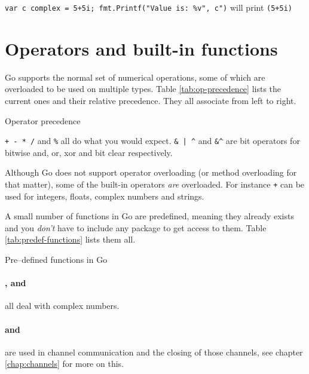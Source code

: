 \lstinline{var c complex = 5+5i; fmt.Printf("Value is: %v", c")}\newline
will print\newline
\indent\lstinline{(5+5i)}

\section{Operators and built-in functions}
Go supports the normal set of numerical operations, some of which are
overloaded to be used on multiple types. Table \ref{tab:op-precedence}
lists the current ones and their relative precedence. They
all associate from left to right.

\begin{table}[H]
\begin{center}
\caption{Operator precedence}
\label{tab:op-precedence}

\end{center}
\end{table}
\verb|+ - * /| and \verb|%| all do what you would expect. 
\verb!& | ^!
and \verb!&^! are bit operators for bitwise and, or, xor and bit clear 
respectively.

Although Go does not support operator overloading (or method
overloading for that matter), some of the built-in
operators \emph{are} overloaded. For instance \texttt{+} can be used for integers,
floats, complex numbers and strings.\hfill

A small number of functions in Go are predefined, meaning they already
exists and you \emph{don't} have to include any package to get
access to them. Table \ref{tab:predef-functions} lists them all.

\begin{table}[H]
\begin{center}
\caption{Pre--defined functions in Go}
\label{tab:predef-functions}

\end{center}
\end{table}

\paragraph{,  and } all deal with
complex numbers.

\paragraph{ and } are used in
channel communication and the closing of those channels, see chapter \ref{chap:channels}
for more on this.

